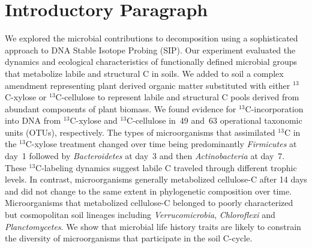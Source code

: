 \section{Introductory Paragraph} We explored the microbial contributions to
decomposition using a sophisticated approach to DNA Stable Isotope Probing
(SIP). Our experiment evaluated the dynamics and ecological characteristics of
functionally defined microbial groups that metabolize labile and structural C
in soils. We added to soil a complex amendment representing plant derived
organic matter substituted with either  $^{13}$C-xylose or $^{13}$C-cellulose
to represent labile and structural C pools derived from abundant components of
plant biomass. We found evidence for $^{13}$C-incorporation into DNA from
$^{13}$C-xylose and $^{13}$C-cellulose in~49 and~63 operational taxonomic
units (OTUs), respectively. The types of microorganisms that assimilated
$^{13}$C in the $^{13}$C-xylose treatment changed over time being predominantly
\textit{Firmicutes} at day~1 followed by \textit{Bacteroidetes} at day~3 and
then \textit{Actinobacteria} at day~7. These $^{13}$C-labeling dynamics 
suggest labile C traveled through different trophic levels. In contrast,
microorganisms generally metabolized cellulose-C after 14 days and did not
change to the same extent in phylogenetic composition over time. Microorganisms
that metabolized cellulose-C belonged to poorly characterized but cosmopolitan
soil lineages including \textit{Verrucomicrobia}, \textit{Chloroflexi} and
\textit{Planctomycetes}. We show that microbial life history traits are likely to
constrain the diversity of microorganisms that participate in the soil C-cycle.
